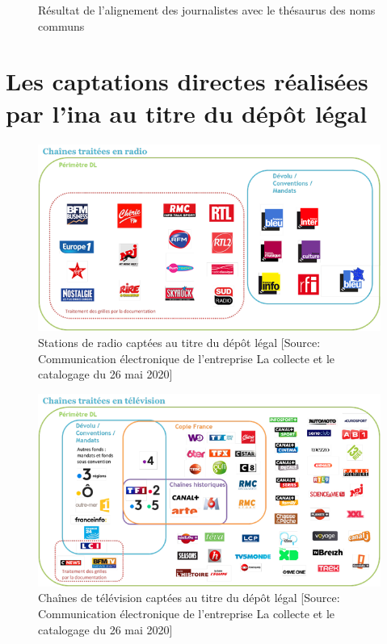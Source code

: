\begin{figure}[!h]
	\centering
	\caption{Résultat de l'alignement des journalistes avec le thésaurus des noms communs}
	\label{alignement_journaliste}
\end{figure}

\chapter{\label{annexe_dl_captation}Les captations directes réalisées par l'\ac{ina} au titre du dépôt légal}

\begin{figure}[!h]
	\centering
	\includegraphics[width=16cm]{images/dl_radio.png}
	\caption[Stations de radio captées au titre du dépôt légal]{Stations de radio captées au titre du dépôt légal [Source: Communication électronique  de l'entreprise \og La collecte et le catalogage\fg{} du 26 mai 2020]}
	\label{dl_radio}
\end{figure}

\begin{figure}[!h]
	\centering
	\includegraphics[width=16cm]{images/dl_tv.png}
	\caption[Chaînes de télévision captées au titre du dépôt légal]{Chaînes de télévision captées au titre du dépôt légal [Source: Communication électronique  de l'entreprise \og La collecte et le catalogage\fg{} du 26 mai 2020]}
	\label{dl_tv}
\end{figure}

